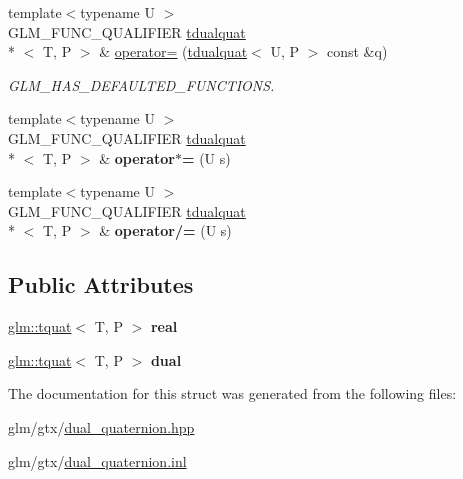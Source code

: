 \begin{DoxyCompactItemize}
\item 
\hypertarget{structglm_1_1tdualquat_a4c6247ec39b3e82e5224988ec4312c77}{{\footnotesize template$<$typename U $>$ }\\G\-L\-M\-\_\-\-F\-U\-N\-C\-\_\-\-Q\-U\-A\-L\-I\-F\-I\-E\-R \hyperlink{structglm_1_1tdualquat}{tdualquat}\\*
$<$ T, P $>$ \& \hyperlink{structglm_1_1tdualquat_a4c6247ec39b3e82e5224988ec4312c77}{operator=} (\hyperlink{structglm_1_1tdualquat}{tdualquat}$<$ U, P $>$ const \&q)}\label{structglm_1_1tdualquat_a4c6247ec39b3e82e5224988ec4312c77}

\begin{DoxyCompactList}\small\item\em G\-L\-M\-\_\-\-H\-A\-S\-\_\-\-D\-E\-F\-A\-U\-L\-T\-E\-D\-\_\-\-F\-U\-N\-C\-T\-I\-O\-N\-S. \end{DoxyCompactList}\item 
\hypertarget{structglm_1_1tdualquat_a0364e641b3b352f8c3eaa98fc952c737}{{\footnotesize template$<$typename U $>$ }\\G\-L\-M\-\_\-\-F\-U\-N\-C\-\_\-\-Q\-U\-A\-L\-I\-F\-I\-E\-R \hyperlink{structglm_1_1tdualquat}{tdualquat}\\*
$<$ T, P $>$ \& {\bfseries operator$\ast$=} (U s)}\label{structglm_1_1tdualquat_a0364e641b3b352f8c3eaa98fc952c737}

\item 
\hypertarget{structglm_1_1tdualquat_a1843b865427cf6d2e474959376a1c412}{{\footnotesize template$<$typename U $>$ }\\G\-L\-M\-\_\-\-F\-U\-N\-C\-\_\-\-Q\-U\-A\-L\-I\-F\-I\-E\-R \hyperlink{structglm_1_1tdualquat}{tdualquat}\\*
$<$ T, P $>$ \& {\bfseries operator/=} (U s)}\label{structglm_1_1tdualquat_a1843b865427cf6d2e474959376a1c412}

\end{DoxyCompactItemize}
\subsection*{Public Attributes}
\begin{DoxyCompactItemize}
\item 
\hypertarget{structglm_1_1tdualquat_a402b3ac8410bd71a27f811dced8db14e}{\hyperlink{structglm_1_1tquat}{glm\-::tquat}$<$ T, P $>$ {\bfseries real}}\label{structglm_1_1tdualquat_a402b3ac8410bd71a27f811dced8db14e}

\item 
\hypertarget{structglm_1_1tdualquat_abeea1eb15f230d3bc50740c3811e1fd3}{\hyperlink{structglm_1_1tquat}{glm\-::tquat}$<$ T, P $>$ {\bfseries dual}}\label{structglm_1_1tdualquat_abeea1eb15f230d3bc50740c3811e1fd3}

\end{DoxyCompactItemize}


The documentation for this struct was generated from the following files\-:\begin{DoxyCompactItemize}
\item 
glm/gtx/\hyperlink{dual__quaternion_8hpp}{dual\-\_\-quaternion.\-hpp}\item 
glm/gtx/\hyperlink{dual__quaternion_8inl}{dual\-\_\-quaternion.\-inl}\end{DoxyCompactItemize}
